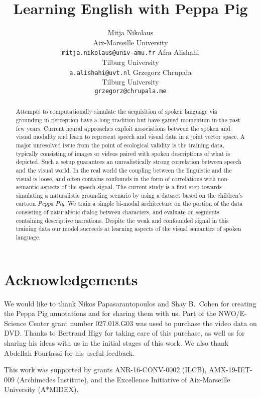 \documentclass[11pt,a4paper]{article}
\begin{document}
\title{Learning English with Peppa Pig}

\author{Mitja Nikolaus\\
  Aix-Marseille University\\
  \texttt{mitja.nikolaus@univ-amu.fr}
  \And
  Afra Alishahi\\
  Tilburg University\\
  \texttt{a.alishahi@uvt.nl}
  \AND
  Grzegorz Chrupała\\
  Tilburg University\\
  \texttt{grzegorz@chrupala.me}}

\date{}


\maketitle
\begin{abstract}
  Attempts to computationally simulate the acquisition of spoken
  language via grounding in perception have a long tradition
  but have gained momentum in the past few years.  Current neural
  approaches exploit associations between the spoken and
  visual modality and learn to represent speech and visual data
  in a joint vector space. A major unresolved issue from the point
  of ecological validity is the training data, typically consisting of
  images or videos paired with spoken descriptions of what is
  depicted. Such a setup guarantees an unrealistically strong
  correlation between speech and the visual world.  In
  the real world the coupling between the linguistic and the visual is
  loose, and often contains confounds in the form of correlations with
  non-semantic aspects of the speech signal. The current study is a
  first step towards simulating a naturalistic grounding scenario by
  using a dataset based on the children's cartoon {\it Peppa Pig}. We
  train a simple bi-modal architecture on the portion of the data
  consisting of naturalistic dialog between characters, and evaluate
  on segments containing descriptive narrations. Despite the weak and confounded
  signal in this training data our model succeeds at learning aspects
  of the visual semantics of spoken language.
\end{abstract}






\section*{Acknowledgements}
We would like to thank Nikos Papasarantopoulos and Shay B.\ Cohen for
creating the Peppa Pig annotations and for sharing them with us.
Part of the NWO/E-Science Center grant number 027.018.G03 was used to
purchase the video data on DVD. Thanks to Bertrand Higy for taking care of this
purchase, as well as for sharing his ideas with us in the initial stages of
this work. We also thank Abdellah Fourtassi for his useful feedback.

This work was supported by grants ANR-16-CONV-0002 (ILCB), AMX-19-IET-009 
(Archimedes Institute), and the Excellence Initiative of Aix-Marseille 
University (A*MIDEX).



%
\end{document}
